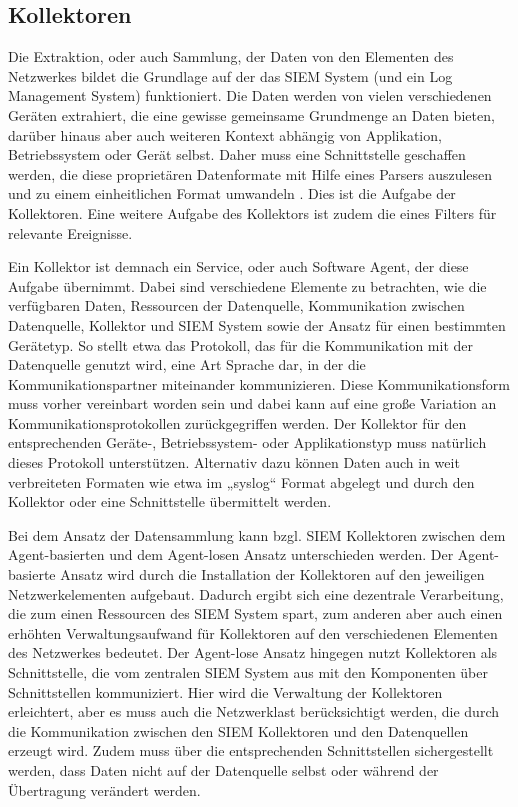 \subsection{Kollektoren}
Die Extraktion, oder auch Sammlung, der Daten von den Elementen des Netzwerkes bildet die Grundlage auf der das SIEM System (und ein Log Management System) funktioniert. Die Daten werden von vielen verschiedenen Geräten extrahiert, die eine gewisse gemeinsame Grundmenge an Daten bieten, darüber hinaus aber auch weiteren Kontext abhängig von Applikation, Betriebssystem oder Gerät selbst. Daher muss eine Schnittstelle geschaffen werden, die diese proprietären Datenformate mit Hilfe eines Parsers auszulesen und zu einem einheitlichen Format umwandeln \citep{AV1}.
Dies ist die Aufgabe der Kollektoren. Eine weitere Aufgabe des Kollektors ist zudem die eines Filters für relevante Ereignisse. 

Ein Kollektor ist demnach ein Service, oder auch Software Agent, der diese Aufgabe übernimmt. Dabei sind verschiedene Elemente zu betrachten, wie die verfügbaren Daten, Ressourcen der Datenquelle, Kommunikation zwischen Datenquelle, Kollektor und SIEM System sowie der Ansatz für einen bestimmten Gerätetyp. So stellt etwa das Protokoll, das für die Kommunikation mit der Datenquelle genutzt wird, eine Art Sprache dar, in der die Kommunikationspartner miteinander kommunizieren. Diese Kommunikationsform muss vorher vereinbart worden sein und dabei kann auf eine große Variation an Kommunikationsprotokollen zurückgegriffen werden. Der Kollektor für den entsprechenden Geräte-, Betriebssystem- oder Applikationstyp muss natürlich dieses Protokoll unterstützen. Alternativ dazu können Daten auch in weit verbreiteten Formaten wie etwa im „syslog“ Format abgelegt und durch den Kollektor oder eine Schnittstelle übermittelt werden.

Bei dem Ansatz der Datensammlung kann bzgl. SIEM Kollektoren zwischen dem Agent-basierten und dem Agent-losen Ansatz unterschieden werden. Der Agent-basierte Ansatz wird durch die Installation der Kollektoren auf den jeweiligen Netzwerkelementen aufgebaut. Dadurch ergibt sich eine dezentrale Verarbeitung, die zum einen Ressourcen des SIEM System spart, zum anderen aber auch einen erhöhten Verwaltungsaufwand für Kollektoren auf den verschiedenen Elementen des Netzwerkes bedeutet. Der Agent-lose Ansatz hingegen nutzt Kollektoren als Schnittstelle, die vom zentralen SIEM System aus mit den Komponenten über Schnittstellen kommuniziert. Hier wird die Verwaltung der Kollektoren erleichtert, aber es muss auch die Netzwerklast berücksichtigt werden, die durch die Kommunikation zwischen den SIEM Kollektoren und den Datenquellen erzeugt wird. Zudem muss über die entsprechenden Schnittstellen sichergestellt werden, dass Daten nicht auf der Datenquelle selbst oder während der Übertragung verändert werden.

